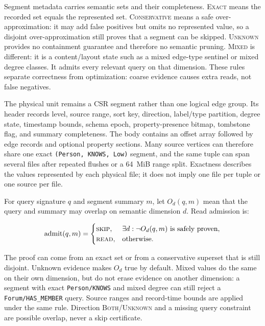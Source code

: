 \documentclass[sigconf,screen]{cidr-2027}
\newcommand{\exact}{\textsc{Exact}\xspace}
\newcommand{\cons}{\textsc{Conservative}\xspace}
\newcommand{\unknown}{\textsc{Unknown}\xspace}
\begin{document}
Segment metadata carries semantic sets and their completeness. \exact means
the recorded set equals the represented set. \cons means a safe
over-approximation: it may add false positives but omits no represented value,
so a disjoint over-approximation still proves that a segment can be skipped.
\unknown provides no containment guarantee and therefore no semantic pruning.
\textsc{Mixed} is different: it is a content/layout state such as a mixed
edge-type sentinel or mixed degree classes. It admits every relevant query on
that dimension. These rules separate correctness from optimization: coarse
evidence causes extra reads, not false negatives.

The physical unit remains a CSR segment rather than one logical edge group.
Its header records level, source range, sort key, direction, label/type
partition, degree state, timestamp bounds, schema epoch, property-presence
bitmap, tombstone flag, and summary completeness. The body contains an offset
array followed by edge records and optional property sections. Many source
vertices can therefore share one exact \texttt{(Person, KNOWS, Low)} segment,
and the same tuple can span several files after repeated flushes or a 64~MiB
range split. Exactness describes the values represented by each physical
file; it does not imply one file per tuple or one source per file.

For query signature $q$ and segment summary $m$, let $O_d(q,m)$ mean that the
query and summary may overlap on semantic dimension $d$. Read admission is:

\begin{equation}
\mathrm{admit}(q,m)=
\begin{cases}
\textsc{skip}, & \exists d:\neg O_d(q,m)\text{ is safely proven},\\
\textsc{read}, & \text{otherwise}.
\end{cases}
\label{eq:admit}
\end{equation}

The proof can come from an exact set or from a conservative superset that is
still disjoint. Unknown evidence makes $O_d$ true by default. Mixed values do
the same on their own dimension, but do not erase evidence on another
dimension: a segment with exact \texttt{Person/KNOWS} and mixed degree can
still reject a \texttt{Forum/HAS\_MEMBER} query. Source ranges and record-time
bounds are applied under the same rule. Direction \textsc{Both}/\textsc{Unknown}
and a missing query constraint are possible overlap, never a skip certificate.
\end{document}
